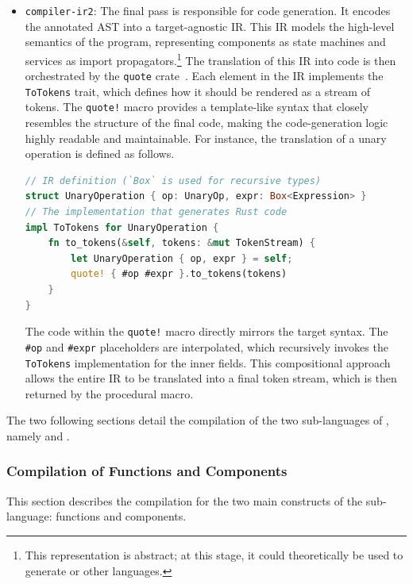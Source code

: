 \begin{itemize}
    \item \texttt{compiler-ir2}: The final pass is responsible for code generation. It encodes
          the annotated AST into a target-agnostic IR. This IR models the high-level semantics of
          the program, representing components as state machines and services as import
          propagators.\footnote{This representation is abstract; at this stage, it could
              theoretically be used to generate \Ci or other languages.} The translation of this IR
          into \Rust code is then orchestrated by the \texttt{quote} crate~\cite{quote_rust}. Each
          element in the IR implements the \texttt{ToTokens} trait, which defines how it should be
          rendered as a stream of \Rust tokens. The \texttt{quote!} macro provides a template-like
          syntax that closely resembles the structure of the final \Rust code, making the
          code-generation logic highly readable and maintainable. For instance, the translation of a
          unary operation is defined as follows.
          \begin{lstlisting}[language=Rust]
// IR definition (`Box` is used for recursive types)
struct UnaryOperation { op: UnaryOp, expr: Box<Expression> }
// The implementation that generates Rust code
impl ToTokens for UnaryOperation {
    fn to_tokens(&self, tokens: &mut TokenStream) {
        let UnaryOperation { op, expr } = self;
        quote! { #op #expr }.to_tokens(tokens)
    }
}
\end{lstlisting}
          The code within the \texttt{quote!} macro directly mirrors the target \Rust syntax. The
          \texttt{\#op} and \texttt{\#expr} placeholders are interpolated, which recursively invokes
          the \texttt{ToTokens} implementation for the inner fields. This compositional approach
          allows the entire IR to be translated into a final token stream, which is then returned by
          the procedural macro.
\end{itemize}

The two following sections detail the compilation of the two sub-languages of \GRust, namely \GRSync
and \GRFRP.

\subsubsection{Compilation of \GRSync Functions and Components}
\label{sec:grust:implem:choices:sync}

This section describes the compilation for the two main constructs of the \GRSync
sub-language: functions and components.

